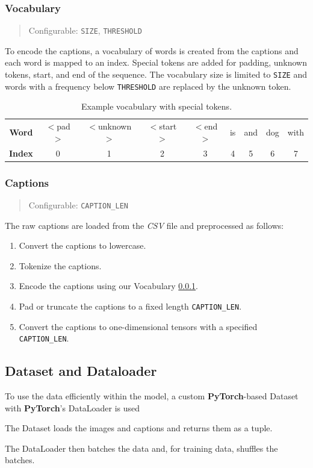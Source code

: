 \documentclass[12pt]{article}
\theoremstyle{plain}
\theoremstyle{definition}
\theoremstyle{remark}
\begin{document}
\subsubsection{Vocabulary}\label{sec:vocabulary}
\begin{quote}\center Configurable: \texttt{SIZE}, \texttt{THRESHOLD} \end{quote}
To encode the captions, a vocabulary of words is created from the captions and each word is mapped to an index. Special tokens are added for padding, unknown tokens, start, and end of the sequence. The vocabulary size is limited to \texttt{SIZE} and words with a frequency below \texttt{THRESHOLD} are replaced by the unknown token.

\begin{table}[H]
    \begin{tabular}{c|cccccccc}
        \textbf{Word} & $<$pad$>$ & $<$unknown$>$ & $<$start$>$ & $<$end$>$ & is & and & dog & with \\
        \textbf{Index} & 0 & 1 & 2 & 3 & 4 & 5 & 6 & 7
    \end{tabular}
    \caption{Example vocabulary with special tokens. \label{tab:vocabulary}}
\end{table}

\subsubsection{Captions}\label{sec:captions}
\begin{quote}\center Configurable: \texttt{CAPTION\_LEN}\end{quote}
The raw captions are loaded from the \textit{CSV} file and preprocessed as follows:
\begin{enumerate}
    \item Convert the captions to lowercase.
    \item Tokenize the captions.
    \item Encode the captions using our Vocabulary \ref{sec:vocabulary}.
    \item Pad or truncate the captions to a fixed length \texttt{CAPTION\_LEN}.
    \item Convert the captions to one-dimensional tensors with a specified \texttt{CAPTION\_LEN}.
\end{enumerate}

\subsection{Dataset and Dataloader}\label{sec:dataset}
To use the data efficiently within the model, a custom \textbf{PyTorch}-based Dataset with \textbf{PyTorch}'s DataLoader is used
\par The Dataset loads the images and captions and returns them as a tuple.
\par The DataLoader then batches the data and, for training data, shuffles the batches.
\end{document}
